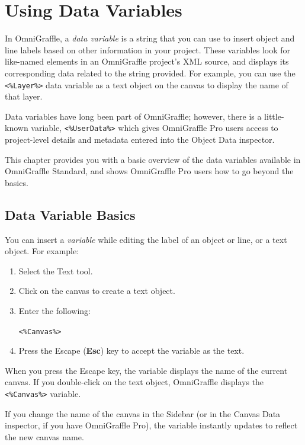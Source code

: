 \documentclass[../main.tex]{subfiles}
\begin{document}
\chapter{Using Data Variables}

In OmniGraffle, a \textit{data variable} is a string that you can use to insert object and line
labels based on other information in your project. These variables look for like-named
elements in an OmniGraffle project's XML source, and displays its corresponding data related
to the string provided. For example, you can use the \texttt{<\%Layer\%>} data variable as a
text object on the canvas to display the name of that layer.

Data variables have long been part of OmniGraffle; however, there is a little-known variable,
\texttt{<\%UserData\%>} which gives OmniGraffle Pro users access to project-level details and
metadata entered into the Object Data inspector.

This chapter provides you with a basic overview of the data variables available in OmniGraffle
Standard, and shows OmniGraffle Pro users how to go beyond the basics.

\section{Data Variable Basics}

You can insert a \textit{variable} while editing the label of an object or line, or a text
object. For example:

\begin{enumerate}
  \item Select the Text tool.
  \item Click on the canvas to create a text object.
  \item Enter the following:

    \texttt{<\%Canvas\%>}
  \item Press the Escape (\textbf{Esc}) key to accept the variable as the text.
\end{enumerate}

When you press the Escape key, the variable displays the name of the current canvas. If you
double-click on the text object, OmniGraffle displays the \texttt{<\%Canvas\%>} variable.


If you change the name of the canvas in the Sidebar (or in the Canvas Data inspector, if you
have OmniGraffle Pro), the variable instantly updates to reflect the new canvas name.
\end{document}
